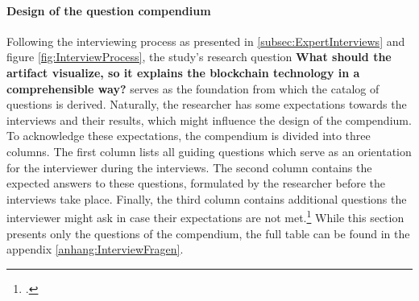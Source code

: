 \paragraph{Design of the question compendium} Following the interviewing process as presented in \ref{subsec:ExpertInterviews} and figure \ref{fig:InterviewProcess}, the study's research question \textbf{What should the artifact visualize, so it explains the blockchain technology in a comprehensible way?} serves as the foundation from which the catalog of questions is derived. Naturally, the researcher has some expectations towards the interviews and their results, which might influence the design of the compendium. To acknowledge these expectations, the compendium is divided into three columns. The first column lists all guiding questions which serve as an orientation for the interviewer during the interviews. The second column contains the expected answers to these questions, formulated by the researcher before the interviews take place. Finally, the third column contains additional questions the interviewer might ask in case their expectations are not met.\footcite[Cf.][p.431]{AghamanoukjanQualitativeInterviews2007} While this section presents only the questions of the compendium, the full table can be found in the appendix \ref{anhang:InterviewFragen}.


